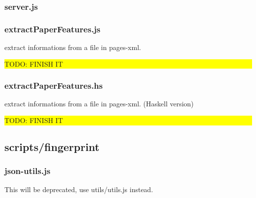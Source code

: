 \documentclass[a4paper,11pt]{report}
\newcommand{\TODO}[1]{\begin{center}\bfseries \colorbox{yellow}{\parbox{0.9\textwidth}{TODO: #1}}\end{center}}
\begin{document}
\subsubsection{server.js}
\subsubsection{extractPaperFeatures.js}
extract informations from a file in pages-xml.
\TODO{FINISH IT}
\subsubsection{extractPaperFeatures.hs}
extract informations from a file in pages-xml. (Haskell version)
\TODO{FINISH IT}
\subsection{scripts/fingerprint}
%
\subsubsection{json-utils.js}
This will be deprecated, use utils/utils.js instead.
%
\end{document}

